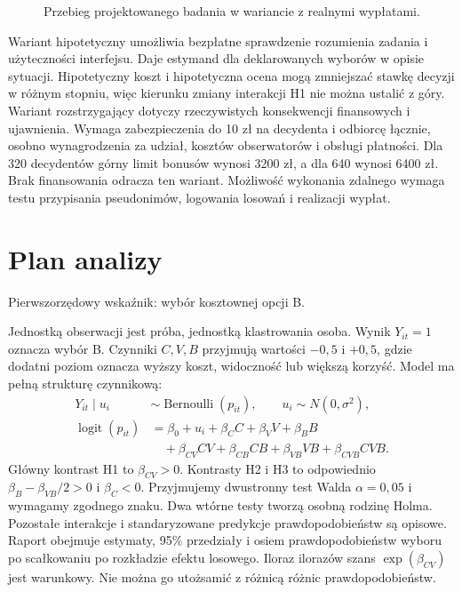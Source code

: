 \documentclass[11pt,a4paper]{article}
\begin{document}
\begin{figure}[htbp]
\centering
{}
\caption{Przebieg projektowanego badania w wariancie z realnymi wypłatami.}
\end{figure}

Wariant hipotetyczny umożliwia bezpłatne sprawdzenie rozumienia zadania i użyteczności interfejsu. Daje estymand dla deklarowanych wyborów w opisie sytuacji. Hipotetyczny koszt i hipotetyczna ocena mogą zmniejszać stawkę decyzji w różnym stopniu, więc kierunku zmiany interakcji H1 nie można ustalić z góry. Wariant rozstrzygający dotyczy rzeczywistych konsekwencji finansowych i ujawnienia. Wymaga zabezpieczenia do 10 zł na decydenta i odbiorcę łącznie, osobno wynagrodzenia za udział, kosztów obserwatorów i obsługi płatności. Dla 320 decydentów górny limit bonusów wynosi 3200 zł, a dla 640 wynosi 6400 zł. Brak finansowania odracza ten wariant. Możliwość wykonania zdalnego wymaga testu przypisania pseudonimów, logowania losowań i realizacji wypłat.

\section{Plan analizy}
\noindent Pierwszorzędowy wskaźnik: wybór kosztownej opcji B.

Jednostką obserwacji jest próba, jednostką klastrowania osoba. Wynik $Y_{it}=1$ oznacza wybór B. Czynniki $C,V,B$ przyjmują wartości $-0{,}5$ i $+0{,}5$, gdzie dodatni poziom oznacza wyższy koszt, widoczność lub większą korzyść. Model ma pełną strukturę czynnikową:
\begin{align*}
Y_{it}\mid u_i&\sim \operatorname{Bernoulli}(p_{it}), \qquad u_i\sim N(0,\sigma^2),\\
\operatorname{logit}(p_{it})&=\beta_0+u_i+\beta_C C+\beta_V V+\beta_B B\\
&\quad+\beta_{CV}CV+\beta_{CB}CB+\beta_{VB}VB+\beta_{CVB}CVB .
\end{align*}
Główny kontrast H1 to $\beta_{CV}>0$. Kontrasty H2 i H3 to odpowiednio $\beta_B-\beta_{VB}/2>0$ i $\beta_C<0$. Przyjmujemy dwustronny test Walda $\alpha=0{,}05$ i wymagamy zgodnego znaku. Dwa wtórne testy tworzą osobną rodzinę Holma. Pozostałe interakcje i standaryzowane predykcje prawdopodobieństw są opisowe. Raport obejmuje estymaty, 95\% przedziały i osiem prawdopodobieństw wyboru po scałkowaniu po rozkładzie efektu losowego. Iloraz ilorazów szans $\exp(\beta_{CV})$ jest warunkowy. Nie można go utożsamić z różnicą różnic prawdopodobieństw.
\end{document}
